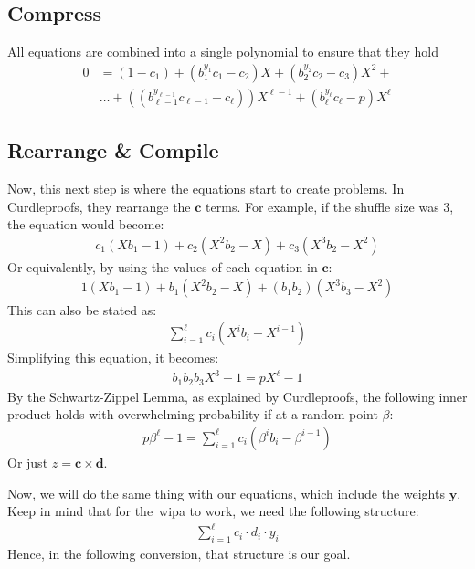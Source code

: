 \subsection{Compress}\label{subsec:compress}
All equations are combined into a single polynomial to ensure that they hold
\begin{align}
    0&=(1-c_1)+(b_{1}^{y_{1}}c_1-c_2)X+(b_{2}^{y_{2}}c_2-c_3)X^2+\\
    &\dots+((b_{\ell-1}^{y_{\ell-1}}c_{\ell-1}-c_\ell))X^{\ell-1}+(b_{\ell}^{y_{\ell}}c_{\ell}-p)X^{\ell}
\end{align}

\subsection{Rearrange \& Compile}\label{subsec:rearrange}
Now, this next step is where the equations start to create problems.
In Curdleproofs, they rearrange the $\mathbf{c}$ terms.
For example, if the shuffle size was 3, the equation would become:
\begin{align}
    c_1(Xb_1-1)+c_2(X^2b_2-X)+c_3(X^3b_2-X^2)
\end{align}
Or equivalently, by using the values of each equation in $\mathbf{c}$:
\begin{align}
    1(Xb_1-1)+b_1(X^2b_2-X)+(b_1b_2)(X^3b_3-X^2)
\end{align}
This can also be stated as:
\begin{align}
    \sum_{i=1}^{\ell}c_i(X^{i}b_{i}-X^{i-1})
\end{align}
Simplifying this equation, it becomes:
\begin{align}
    b_{1}b_{2}b_{3}X^3-1=pX^{\ell}-1
\end{align}
By the Schwartz-Zippel Lemma, as explained by Curdleproofs, the following inner product holds with overwhelming probability if at a random point $\beta$:
\begin{align}
    p\beta^{\ell}-1=\sum_{i=1}^{\ell}c_i(\beta^{i}b_i-\beta^{i-1})
\end{align}
Or just $z=\mathbf{c}\times\mathbf{d}$.

Now, we will do the same thing with our equations, which include the weights $\mathbf{y}$.
Keep in mind that for the~\gls{wipa} to work, we need the following structure:
\begin{align}\label{eq:structure}
    \sum_{i=1}^{\ell}c_i\cdot d_i\cdot y_i
\end{align}
Hence, in the following conversion, that structure is our goal.

